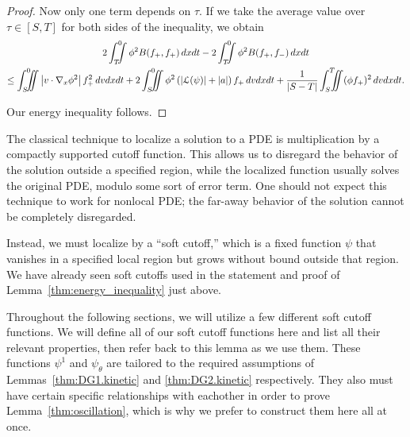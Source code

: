 \begin{proof}
Now only one term depends on $\tau$.  If we take the average value over $\tau \in [S,T]$ for both sides of the inequality, we obtain
\begin{multline*} 
2\int_T^0\!\!\!\!\int \phi^2 B(f_+,f_+) \,dxdt - 2\int_T^0\!\!\!\!\int \phi^2 B(f_+,f_-) \,dxdt \\
\leq \int_S^0\!\!\!\!\iint \abs{v\cdot\grad_x \phi^2} f_+^2 \,dvdxdt + 2\int_S^0\!\!\!\!\iint \phi^2 \paren{\abs{\L(\psi)}+|a|} f_+ \,dvdxdt + \frac{1}{|S-T|}\int_S^T\!\!\!\!\iint (\phi f_+)^2 \,dvdxdt. 
\end{multline*}

Our energy inequality follows.  
\end{proof}

The classical technique to localize a solution to a PDE is multiplication by a compactly supported cutoff function.  This allows us to disregard the behavior of the solution outside a specified region, while the localized function usually solves the original PDE, modulo some sort of error term.  One should not expect this technique to work for nonlocal PDE; the far-away behavior of the solution cannot be completely disregarded.  

Instead, we must localize by a ``soft cutoff,'' which is a fixed function $\psi$ that vanishes in a specified local region but grows without bound outside that region.  We have already seen soft cutoffs used in the statement and proof of Lemma~\ref{thm:energy_inequality} just above.  
%
%


Throughout the following sections, we will utilize a few different soft cutoff functions.  We will define all of our soft cutoff functions here and list all their relevant properties, then refer back to this lemma as we use them.  These functions $\psi^1$ and $\psi_\theta$ are tailored to the required assumptions of Lemmas~\ref{thm:DG1.kinetic} and \ref{thm:DG2.kinetic} respectively.  They also must have certain specific relationships with eachother in order to prove Lemma~\ref{thm:oscillation}, which is why we prefer to construct them here all at once.  

